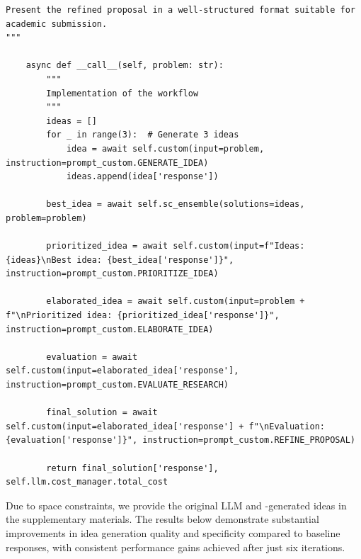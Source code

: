 \begin{tcolorbox}[title={\textbf{\small Idea generation workflow}}, boxrule=2pt, arc=0mm, breakable]
\begin{verbatim}
Present the refined proposal in a well-structured format suitable for academic submission.
"""

    async def __call__(self, problem: str):
        """
        Implementation of the workflow
        """
        ideas = []
        for _ in range(3):  # Generate 3 ideas
            idea = await self.custom(input=problem, instruction=prompt_custom.GENERATE_IDEA)
            ideas.append(idea['response'])
        
        best_idea = await self.sc_ensemble(solutions=ideas, problem=problem)
        
        prioritized_idea = await self.custom(input=f"Ideas: {ideas}\nBest idea: {best_idea['response']}", instruction=prompt_custom.PRIORITIZE_IDEA)
        
        elaborated_idea = await self.custom(input=problem + f"\nPrioritized idea: {prioritized_idea['response']}", instruction=prompt_custom.ELABORATE_IDEA)
        
        evaluation = await self.custom(input=elaborated_idea['response'], instruction=prompt_custom.EVALUATE_RESEARCH)
        
        final_solution = await self.custom(input=elaborated_idea['response'] + f"\nEvaluation: {evaluation['response']}", instruction=prompt_custom.REFINE_PROPOSAL)
        
        return final_solution['response'], self.llm.cost_manager.total_cost

\end{verbatim}
\end{tcolorbox}

Due to space constraints, we provide the original LLM and \model-generated ideas in the supplementary materials. The results below demonstrate substantial improvements in idea generation quality and specificity compared to baseline responses, with consistent performance gains achieved after just six iterations.

